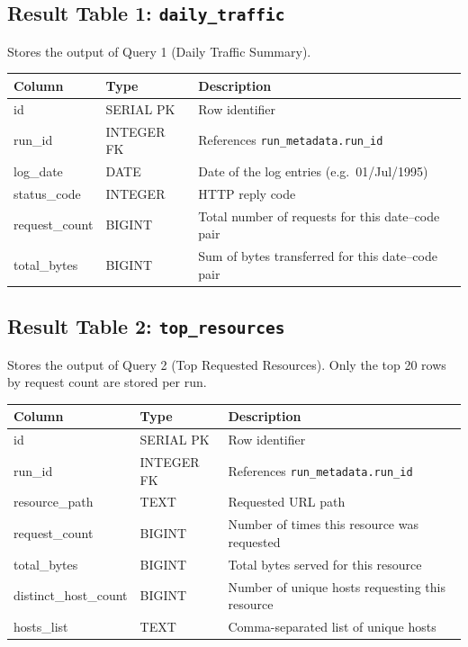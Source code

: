 \documentclass[11pt,a4paper]{article}
\begin{document}
\subsection{Result Table 1: \texttt{daily\_traffic}}

Stores the output of Query 1 (Daily Traffic Summary).

\begin{schematable}
\begin{tabularx}{\linewidth}{@{} >{\ttfamily\small}l >{\small}l X @{}}
\toprule
\textnormal{\textbf{Column}} & \textbf{Type} & \textbf{Description} \\
\midrule
id            & SERIAL PK  & Row identifier \\
run\_id       & INTEGER FK & References \texttt{run\_metadata.run\_id} \\
log\_date     & DATE       & Date of the log entries (e.g.\ 01/Jul/1995) \\
status\_code  & INTEGER    & HTTP reply code \\
request\_count & BIGINT    & Total number of requests for this date--code pair \\
total\_bytes  & BIGINT     & Sum of bytes transferred for this date--code pair \\
\bottomrule
\end{tabularx}
\end{schematable}

\subsection{Result Table 2: \texttt{top\_resources}}

Stores the output of Query 2 (Top Requested Resources). Only the top 20 rows by request count are stored per run.

\begin{schematable}
\begin{tabularx}{\linewidth}{@{} >{\ttfamily\small}l >{\small}l X @{}}
\toprule
\textnormal{\textbf{Column}} & \textbf{Type} & \textbf{Description} \\
\midrule
id                 & SERIAL PK  & Row identifier \\
run\_id            & INTEGER FK & References \texttt{run\_metadata.run\_id} \\
resource\_path     & TEXT       & Requested URL path \\
request\_count     & BIGINT     & Number of times this resource was requested \\
total\_bytes       & BIGINT     & Total bytes served for this resource \\
distinct\_host\_count & BIGINT  & Number of unique hosts requesting this resource \\
hosts\_list        & TEXT       & Comma-separated list of unique hosts \\
\bottomrule
\end{tabularx}
\end{schematable}
\end{document}
